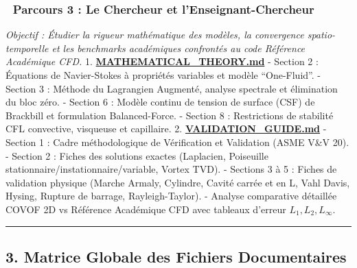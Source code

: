 \documentclass[
  french,
]{article}
\begin{document}
\subsubsection{🔬 Parcours 3 : Le Chercheur et
l'Enseignant-Chercheur}\label{parcours-3-le-chercheur-et-lenseignant-chercheur}

\emph{Objectif : Étudier la rigueur mathématique des modèles, la
convergence spatio-temporelle et les benchmarks académiques confrontés
au code Référence Académique CFD.} 1.
\textbf{\href{file:///Users/elhadjiibrahimathiam/Documents/PROJET_ANTIGRAVITY/COVOF_2D-C++/docs/MATHEMATICAL_THEORY.md}{MATHEMATICAL\_THEORY.md}}
- Section 2 : Équations de Navier-Stokes à propriétés variables et
modèle ``One-Fluid''. - Section 3 : Méthode du Lagrangien Augmenté,
analyse spectrale et élimination du bloc zéro. - Section 6 : Modèle
continu de tension de surface (CSF) de Brackbill et formulation
Balanced-Force. - Section 8 : Restrictions de stabilité CFL convective,
visqueuse et capillaire. 2.
\textbf{\href{file:///Users/elhadjiibrahimathiam/Documents/PROJET_ANTIGRAVITY/COVOF_2D-C++/docs/VALIDATION_GUIDE.md}{VALIDATION\_GUIDE.md}}
- Section 1 : Cadre méthodologique de Vérification et Validation (ASME
V\&V 20). - Section 2 : Fiches des solutions exactes (Laplacien,
Poiseuille stationnaire/instationnaire/variable, Vortex TVD). - Sections
3 à 5 : Fiches de validation physique (Marche Armaly, Cylindre, Cavité
carrée et en L, Vahl Davis, Hysing, Rupture de barrage,
Rayleigh-Taylor). - Analyse comparative détaillée COVOF 2D vs Référence
Académique CFD avec tableaux d'erreur \(L_1, L_2, L_\infty\).

\begin{center}\rule{0.5\linewidth}{0.5pt}\end{center}

\subsection{3. Matrice Globale des Fichiers
Documentaires}\label{matrice-globale-des-fichiers-documentaires}
\end{document}
